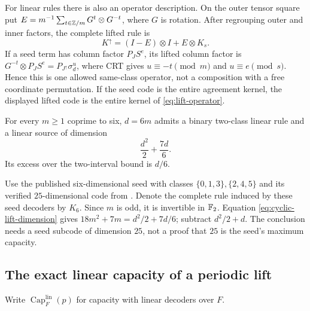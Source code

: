 For linear rules there is also an operator description. On the outer
tensor square put
$E=m^{-1}\sum_{t\in\mathbb{Z}/m}G^t\otimes G^{-t}$, where $G$ is rotation.
After regrouping outer and inner factors, the complete lifted rule is
\begin{equation}\label{eq:lift-operator}
 K^\uparrow=(I-E)\otimes I+E\otimes K_s.
\end{equation}
If a seed term has column factor $P_JS^e$, its lifted column factor is
$G^{-t}\otimes P_JS^e=P_{J^\uparrow}\sigma_d^u$, where CRT gives
$u\equiv-t\pmod m$ and $u\equiv e\pmod s$. Hence this is one allowed
same-class operator, not a composition with a free coordinate permutation.
If the seed code is the entire agreement kernel, the displayed lifted
code is the entire kernel of \eqref{eq:lift-operator}.

\begin{corollary}\label{cor:fixed-two-excess}
For every $m\ge1$ coprime to six, $d=6m$ admits a binary two-class
linear rule and a linear source of dimension
\[
 \frac{d^2}{2}+\frac{7d}{6}.
\]
Its excess over the two-interval bound is $d/6$.
\end{corollary}
\begin{outline}
Use the published six-dimensional seed with classes
$\{0,1,3\},\{2,4,5\}$ and its verified $25$-dimensional code
from \cite{SeventeenthPaper2026,ClassUniformMemo2026}.
Denote the complete rule induced by these seed decoders by $K_6$.
Since $m$ is odd, it is invertible in $\mathbb{F}_2$.
Equation \eqref{eq:cyclic-lift-dimension} gives
$18m^2+7m=d^2/2+7d/6$; subtract $d^2/2+d$.
The conclusion needs a seed subcode of dimension $25$, not a proof that
$25$ is the seed's maximum capacity.
\end{outline}

\subsection{The exact linear capacity of a periodic lift}

Write $\operatorname{Cap}^{\mathrm{lin}}_F(p)$ for capacity with linear
decoders over $F$.

